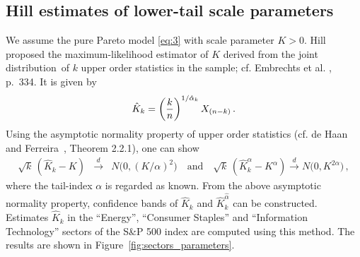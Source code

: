\documentclass[11pt,a4]{amsart}
\newcommand{\beao}{\begin{eqnarray*}}
\newcommand{\eeao}{\end{eqnarray*}\noindent}
\newcommand{\std}{\stackrel{d}{\rightarrow}}
\newcommand{\ds}{distribution}
\newcommand{\1}{{\mathbf 1}}
\begin{document}
\subsection{Hill estimates of lower-tail scale parameters}\label{sec:HillScaleEstimates}
We assume the pure Pareto model \eqref{eq:3} with scale parameter $K>0$.
Hill \cite{hill1975simple} proposed  the maximum-likelihood estimator of $K$
derived from the joint \ds\ of $k$ upper order statistics in the sample; cf.
Embrechts et al. \cite{embrechts:klueppelberg:mikosch:1997}, p.~334.
It is given by
\beao
\hat K_k = \left({k \over n}\right)^{1/\hat\alpha_k} X_{(n-k)}\,.
\eeao
Using the asymptotic normality property of upper order statistics
(cf. de Haan and Ferreira~\cite{haan:ferreira:2006}, Theorem 2.2.1), one can show
\beao
  \sqrt{k}\, (\hat K_k - K) &\std& N\big(
    0, (K /\alpha)^2\big)\quad\mbox{and}\quad
  \sqrt {k} \,(\hat K_k^\alpha - K^\alpha) \overset{d}{\to} N\big(
    0, K^{2\alpha}  \big)\,,
\end{eqnarray*}
where the tail-index $\alpha$ is regarded as known. From the above
asymptotic normality property, confidence bands of $\hat K_k$
and $\hat K_k^{\hat\alpha}$ can be constructed.   
Estimates $\hat K_k$ in the ``Energy'', ``Consumer Staples'' and
``Information Technology'' sectors of the S\&P 500 index are computed
using this method. The results are shown in
Figure~\ref{fig:sectors_parameters}.
\end{document}
